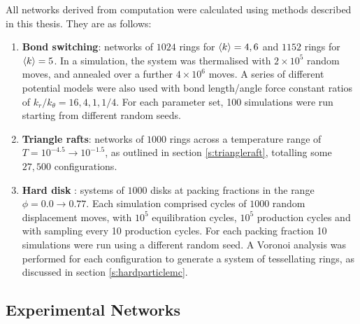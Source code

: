 All networks derived from computation were calculated using methods described in this thesis.
They are as follows:
\begin{enumerate}
	\item \textbf{Bond switching}: networks of $1024$ rings for $\langle k \rangle=4,6$ and $1152$ rings for $\langle k \rangle=5$. 
	In a simulation, the system was thermalised with $2\times 10^5$ random moves, and annealed over a further $4\times 10^6$ moves. 
	A series of different potential models were also used with bond length/angle force constant ratios of $k_r/k_\theta=16,4,1,1/4$. 
	For each parameter set, 100 simulations were run starting from different random seeds.
	\item \textbf{Triangle rafts}: networks of $1000$ rings across a temperature range of $T=10^{-4.5}\rightarrow10^{-1.5}$, as outlined in section \ref{s:triangleraft}, totalling some $27,500$ configurations.  
	\item \textbf{Hard disk \mc}: systems of $1000$ disks at packing fractions in the range $\phi=0.0\rightarrow0.77$.
	Each simulation comprised cycles of $1000$ random displacement moves, with $10^5$ equilibration cycles, $10^5$ production cycles and with sampling every 10 production cycles. 
	For each packing fraction 10 simulations were run using a different random seed.
	 A Voronoi analysis was performed for each configuration to generate a system of tessellating rings, as discussed in section \ref{s:hardparticlemc}.
\end{enumerate} 

\subsection{Experimental Networks}
\label{s:genexpnetworks}

